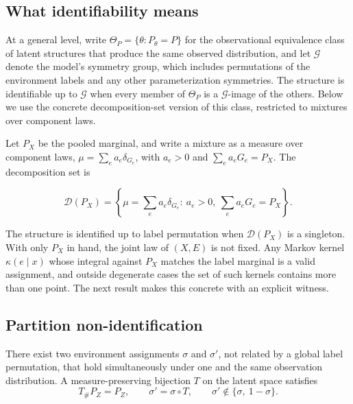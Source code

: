 \subsection{What identifiability
means}\label{what-identifiability-means}

At a general level, write \(\Theta_P=\{\theta:P_\theta=P\}\) for the
observational equivalence class of latent structures that produce the
same observed distribution, and let \(\mathcal G\) denote the model's
symmetry group, which includes permutations of the environment labels
and any other parameterization symmetries. The structure is identifiable
up to \(\mathcal G\) when every member of \(\Theta_P\) is a
\(\mathcal G\)-image of the others. Below we use the concrete
decomposition-set version of this class, restricted to mixtures over
component laws.

Let \(P_X\) be the pooled marginal, and write a mixture as a measure
over component laws, \(\mu=\sum_e a_e\delta_{G_e}\), with \(a_e>0\) and
\(\sum_e a_e G_e=P_X\). The decomposition set is

\begin{equation}\label{eq:identified-set}
\mathcal D(P_X)=\left\{\mu=\sum_e a_e\delta_{G_e}:\ a_e>0,\ \sum_e a_e G_e=P_X\right\}.
\end{equation}

The structure is identified up to label permutation when
\(\mathcal D(P_X)\) is a singleton. With only \(P_X\) in hand, the joint
law of \((X,E)\) is not fixed. Any Markov kernel \(\kappa(e\mid x)\)
whose integral against \(P_X\) matches the label marginal is a valid
assignment, and outside degenerate cases the set of such kernels
contains more than one point. The next result makes this concrete with
an explicit witness.

\subsection{Partition
non-identification}\label{partition-non-identification}

\begin{theorem}\label{thm:d2}
There exist two environment assignments $\sigma$ and $\sigma'$, not related by a global label permutation, that hold simultaneously under one and the same observation distribution. A measure-preserving bijection $T$ on the latent space satisfies
\begin{equation}\label{eq:witness}
T_\#P_Z=P_Z,\qquad \sigma'=\sigma\circ T,\qquad \sigma'\notin\{\sigma,\ 1-\sigma\}.
\end{equation}
\end{theorem}

